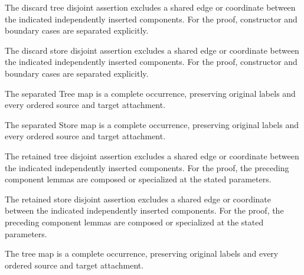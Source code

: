 The discard tree disjoint assertion excludes a shared edge or coordinate between the indicated independently inserted components.
For the proof, constructor and boundary cases are separated explicitly.
\par{}

The discard store disjoint assertion excludes a shared edge or coordinate between the indicated independently inserted components.
For the proof, constructor and boundary cases are separated explicitly.
\par{}

The separated Tree map is a complete occurrence, preserving original labels and every ordered source and target attachment.
\par{}

The separated Store map is a complete occurrence, preserving original labels and every ordered source and target attachment.
\par{}

The retained tree disjoint assertion excludes a shared edge or coordinate between the indicated independently inserted components.
For the proof, the preceding component lemmas are composed or specialized at the stated parameters.
\par{}

The retained store disjoint assertion excludes a shared edge or coordinate between the indicated independently inserted components.
For the proof, the preceding component lemmas are composed or specialized at the stated parameters.
\par{}

The tree map is a complete occurrence, preserving original labels and every ordered source and target attachment.
\par{}

